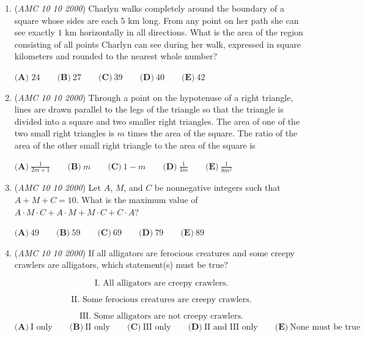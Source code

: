 \begin{enumerate}
 $\textbf{(A) } \$3.63  \qquad \textbf{(B) } \$5.13 \qquad \textbf{(C) } \$6.30 \qquad \textbf{(D) } \$7.45 \qquad \textbf{(E) } \$9.07$


	\item (\textit{AMC 10 10 2000}) Charlyn walks completely around the boundary of a square whose sides are each $5$ km long. From any point on her path she can see exactly $1$ km horizontally in all directions. What is the area of the region consisting of all points Charlyn can see during her walk, expressed in square kilometers and rounded to the nearest whole number?


 $\textbf{(A) } 24 \qquad\textbf{(B)}\ 27 \qquad\textbf{(C)}\ 39 \qquad\textbf{(D)}\ 40 \qquad\textbf{(E)}\ 42$


	\item (\textit{AMC 10 10 2000}) Through a point on the hypotenuse of a right triangle, lines are drawn parallel to the legs of the triangle so that the triangle is divided into a square and two smaller right triangles. The area of one of the two small right triangles is $m$ times the area of the square. The ratio of the area of the other small right triangle to the area of the square is


 $\textbf{(A)}\ \frac{1}{2m+1} \qquad\textbf{(B)}\ m \qquad\textbf{(C)}\ 1-m \qquad\textbf{(D)}\ \frac{1}{4m} \qquad\textbf{(E)}\ \frac{1}{8m^2}$


	\item (\textit{AMC 10 10 2000}) Let $A$, $M$, and $C$ be nonnegative integers such that $A+M+C=10$.  What is the maximum value of $A\cdot M\cdot C+A\cdot M+M\cdot C+C\cdot A$?


 $\textbf{(A)}\ 49 \qquad\textbf{(B)}\ 59 \qquad\textbf{(C)}\ 69 \qquad\textbf{(D)}\ 79 \qquad\textbf{(E)}\ 89$


	\item (\textit{AMC 10 10 2000}) If all alligators are ferocious creatures and some creepy crawlers are alligators, which statement(s) must be true?


 
 \[\textrm{I. All alligators are creepy crawlers.}\]

 \[\textrm{II. Some ferocious creatures are creepy crawlers.}\]

 \[\textrm{III. Some alligators are not creepy crawlers.}\]
$\textbf{(A)}\ \text{I only} \qquad\textbf{(B)}\ \text{II only} \qquad\textbf{(C)}\ \text{III only} \qquad\textbf{(D)}\ \text{II and III only} \qquad\textbf{(E)}\ \text{None must be true}$



\end{enumerate}
